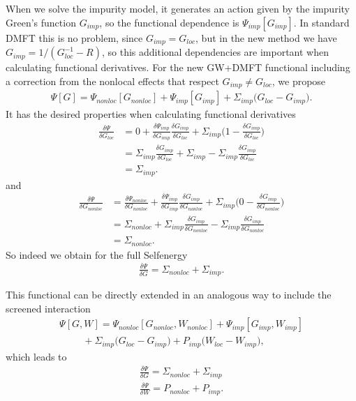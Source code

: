 \documentclass[12pt,a4paper]{scrartcl}
\numberwithin{equation}{section}
\begin{document}
    When we solve the impurity model, it generates an action given by the impurity Green's function $G_{imp}$,
  so the functional dependence is $\Psi_{imp}[G_{imp}]$. In standard DMFT this is no problem,
  since $G_{imp}=G_{loc}$, but in the new method we have $G_{imp} = 1/(G^{-1}_{loc} - R)$, so this additional dependencies are important
  when calculating functional derivatives.
For the new GW+DMFT functional including a correction from the nonlocal effects that
respect $G_{imp} \neq G_{loc}$, we propose
\begin{align}
\boxed{
 \Psi[G] = \Psi_{nonloc}[G_{nonloc}] + \Psi_{imp}[G_{imp}] + \Sigma_{imp} \big( G_{loc} - G_{imp} \big) } .
\end{align}
It has the desired properties when calculating functional derivatives
\begin{align}
 \frac{\delta \Psi}{\delta G_{loc}}
 &= 0 + \frac{\delta \Psi_{imp}}{\delta G_{imp}} \frac{\delta G_{imp}}{\delta G_{loc}}
   + \Sigma_{imp} \Big( 1 - \frac{\delta G_{imp}}{\delta G_{loc}} \Big) \\
&= \Sigma_{imp} \frac{\delta G_{imp}}{\delta G_{loc}}
   + \Sigma_{imp}  - \Sigma_{imp} \frac{\delta G_{imp}}{\delta G_{loc}}  \\
&=\Sigma_{imp}   .
\end{align}
and
\begin{align}
 \frac{\delta \Psi}{\delta G_{nonloc}}
 &= \frac{\delta \Psi_{nonloc}}{\delta G_{nonloc}}
  +\frac{\delta \Psi_{imp}}{\delta G_{imp}} \frac{\delta G_{imp}}{\delta G_{nonloc}}
    + \Sigma_{imp} \Big( 0 - \frac{\delta G_{imp}}{\delta G_{nonloc}} \Big) \\
&=\Sigma_{nonloc}  + \Sigma_{imp}\frac{\delta G_{imp}}{\delta G_{nonloc}}
    - \Sigma_{imp}\frac{\delta G_{imp}}{\delta G_{nonloc}}  \\
&=\Sigma_{nonloc}.     
\end{align}
So indeed we obtain for the full Selfenergy
\begin{align}
 \frac{\delta \Psi}{\delta G}
 =\Sigma_{nonloc} + \Sigma_{imp} .
\end{align}

\bigskip

This functional can be directly extended in an analogous way to include the screened interaction
\begin{align}
 \Psi[G,W] = \Psi_{nonloc}[G_{nonloc},W_{nonloc}] 
  + \Psi_{imp}[G_{imp},W_{imp}]  \\
   \hspace{1cm} + \Sigma_{imp} \big( G_{loc} - G_{imp} \big) 
  + P_{imp} \big( W_{loc} - W_{imp} \big)  ,
\end{align}
which leads to
\begin{align}
 \frac{\delta \Psi}{\delta G}  =\Sigma_{nonloc} + \Sigma_{imp} \\
 \frac{\delta \Psi}{\delta W}  =P_{nonloc} + P_{imp} .
\end{align}
\end{document}
